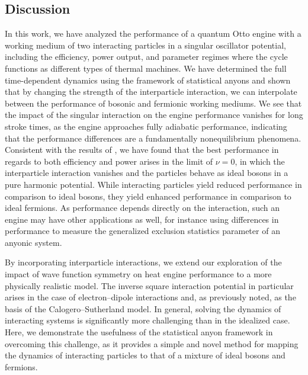\documentclass[preprints,article,accept,moreauthors,pdftex]{Definitions/mdpi}
\begin{document}
\begin{paracol}{2}
	\switchcolumn   
    
\vspace{-9pt}

\section{Discussion}

In this work, we have analyzed the performance of a quantum Otto engine with a working medium of two {interacting} particles in a singular oscillator potential, including the efficiency, power output, and parameter regimes where the cycle functions as different types of thermal machines. We have determined the full time-dependent dynamics using the framework of statistical anyons and shown that by changing the strength of the interparticle interaction, we can interpolate between the performance of bosonic and fermionic working mediums. We see that the impact of the singular interaction on the engine performance vanishes for long stroke times, as the engine approaches fully adiabatic performance, indicating that the performance differences are a fundamentally nonequilibrium phenomena. {Consistent with the results of \cite{Myers2020}, we have found that the best performance in regards to both efficiency and power arises in the limit of $\nu = 0$, in which the interparticle interaction vanishes and the particles behave as ideal bosons in a pure harmonic potential. While interacting particles yield reduced performance in comparison to ideal bosons, they yield enhanced performance in comparison to ideal fermions. As performance depends directly on the interaction, such an engine may have other applications as well, for instance using differences in performance to measure the generalized exclusion statistics parameter of an anyonic system.} 
	
{By incorporating interparticle interactions, we extend our exploration of the impact of wave function symmetry on heat engine performance to a more physically realistic model. The inverse square interaction potential in particular arises in the case of electron--dipole interactions \cite{LevyLeblond1967, Jaramillo2010} and, as previously noted, as the basis of the Calogero--Sutherland model. In general, solving the dynamics of interacting systems is significantly more challenging than in the idealized case. Here, we demonstrate the usefulness of the statistical anyon framework in overcoming this challenge, as it provides a simple and novel method for mapping the dynamics of interacting particles to that of a mixture of ideal bosons and fermions.}      


\end{paracol}
\end{document}
